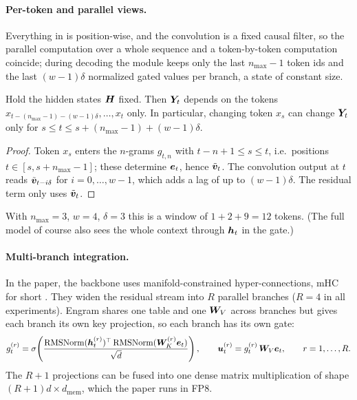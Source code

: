 \paragraph{Per-token and parallel views.} Everything in 
is position-wise, and the convolution is a fixed causal filter, so the parallel computation over a
whole sequence and a token-by-token computation coincide; during decoding the module keeps only
the last $n_{\max}-1$ token ids and the last $(w-1)\delta$ normalized gated values per branch, a
state of constant size.

\begin{proposition}\label{prop:c10-engram-rf}
Hold the hidden states $\bm{H}$ fixed. Then $\bm{Y}_t$ depends on the tokens
$x_{t-(n_{\max}-1)-(w-1)\delta}, \dots, x_t$ only. In particular, changing token $x_s$ can change
$\bm{Y}_t$ only for $s \le t \le s + (n_{\max}-1) + (w-1)\delta$.
\end{proposition}
\begin{proof}
Token $x_s$ enters the $n$-grams $g_{t,n}$ with $t - n + 1 \le s \le t$, i.e.\ positions
$t \in [s, s + n_{\max} - 1]$; these determine $\bm{e}_t$, hence $\tilde{\bm{v}}_t$. The convolution
output at $t$ reads $\tilde{\bm{v}}_{t - i\delta}$ for $i = 0,\dots,w-1$, which adds a lag of up to
$(w-1)\delta$. The residual term only uses $\tilde{\bm{v}}_t$.
\end{proof}
With $n_{\max} = 3$, $w = 4$, $\delta = 3$ this is a window of $1 + 2 + 9 = 12$ tokens. (The full
model of course also sees the whole context through $\bm{h}_t$ in the gate.)

\paragraph{Multi-branch integration.} In the paper, the backbone uses manifold-constrained
hyper-connections, mHC for short \citep{c10-xie2025mhc,c10-zhu2025hyperconnections}. They widen the
residual stream into $R$ parallel branches ($R = 4$ in all experiments). Engram
shares one table and one $\bm{W}_V$ across branches but gives each branch its own key projection, so
each branch has its own gate:
\begin{equation}
  g_t^{(r)} = \sigma\!\left(\frac{\operatorname{RMSNorm}(\bm{h}^{(r)}_t)^{\top} \operatorname{RMSNorm}(\bm{W}^{(r)}_K \bm{e}_t)}{\sqrt{d}}\right),
  \qquad \bm{u}^{(r)}_t = g_t^{(r)}\, \bm{W}_V \bm{e}_t, \qquad r = 1,\dots,R .
  \label{eq:c10-engram-mhc}
\end{equation}
The $R+1$ projections can be fused into one dense matrix multiplication of shape
$(R+1)d \times d_{\mathrm{mem}}$, which the paper runs in FP8.

